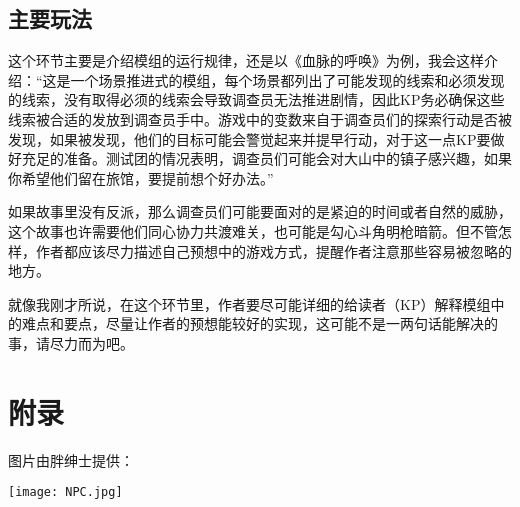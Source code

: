 \documentclass[a4paper,zihao=-4,notitlepage,twoside,openright]{ctexart}
\begin{document}
\subsection{主要玩法}

这个环节主要是介绍模组的运行规律，还是以《血脉的呼唤》为例，我会这样介绍：“这是一个场景推进式的模组，每个场景都列出了可能发现的线索和必须发现的线索，没有取得必须的线索会导致调查员无法推进剧情，因此KP务必确保这些线索被合适的发放到调查员手中。游戏中的变数来自于调查员们的探索行动是否被发现，如果被发现，他们的目标可能会警觉起来并提早行动，对于这一点KP要做好充足的准备。测试团的情况表明，调查员们可能会对大山中的镇子感兴趣，如果你希望他们留在旅馆，要提前想个好办法。”

如果故事里没有反派，那么调查员们可能要面对的是紧迫的时间或者自然的威胁，这个故事也许需要他们同心协力共渡难关，也可能是勾心斗角明枪暗箭。但不管怎样，作者都应该尽力描述自己预想中的游戏方式，提醒作者注意那些容易被忽略的地方。

就像我刚才所说，在这个环节里，作者要尽可能详细的给读者（KP）解释模组中的难点和要点，尽量让作者的预想能较好的实现，这可能不是一两句话能解决的事，请尽力而为吧。

\section*{附录}

图片由胖绅士提供：

\texttt{[image: NPC.jpg]}
\end{document}
